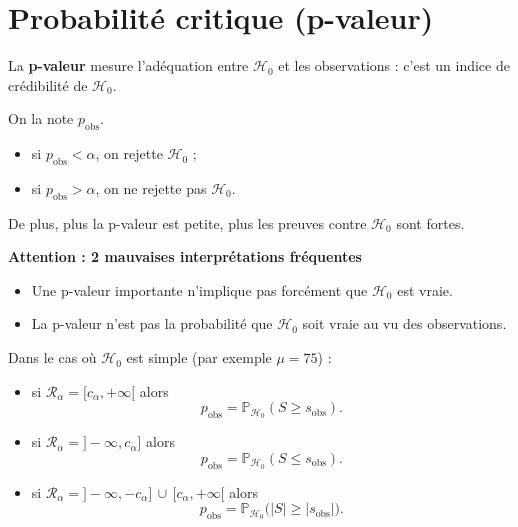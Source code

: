 \section{Probabilité critique (p-valeur)}

La \textbf{p-valeur} mesure l'adéquation entre $\mathcal{H}_0$ et les observations : c'est un indice de crédibilité de $\mathcal{H}_0$.  

On la note $p_{\text{obs}}$.  

\begin{itemize}
\item si $p_{\text{obs}} < \alpha$, on rejette $\mathcal{H}_0$ ;  
\item si $p_{\text{obs}} > \alpha$, on ne rejette pas $\mathcal{H}_0$.  
\end{itemize}

De plus, plus la p-valeur est petite, plus les preuves contre $\mathcal{H}_0$ sont fortes.

\begin{remarque}
\textbf{Attention : 2 mauvaises interprétations fréquentes}
\begin{itemize}
\item Une p-valeur importante n'implique pas forcément que $\mathcal{H}_0$ est vraie.
\item La p-valeur n'est pas la probabilité que $\mathcal{H}_0$ soit vraie au vu des observations.
\end{itemize}
\end{remarque}


\begin{proposition}
Dans le cas où $\mathcal{H}_0$ est simple (par exemple $\mu = 75$) :

\begin{itemize}
\item si $\mathcal{R}_\alpha = [c_\alpha, +\infty[$ alors
\[
p_{\text{obs}} = \mathbb{P}_{\mathcal{H}_0}(S \geq s_{\text{obs}}).
\]

\item si $\mathcal{R}_\alpha = ]-\infty, c_\alpha]$ alors
\[
p_{\text{obs}} = \mathbb{P}_{\mathcal{H}_0}(S \leq s_{\text{obs}}).
\]

\item si $\mathcal{R}_\alpha = ]-\infty, -c_\alpha] \,\cup\, [c_\alpha, +\infty[$ alors
\[
p_{\text{obs}} = \mathbb{P}_{\mathcal{H}_0}\big(|S| \geq |s_{\text{obs}}|\big).
\]
\end{itemize}
\end{proposition}